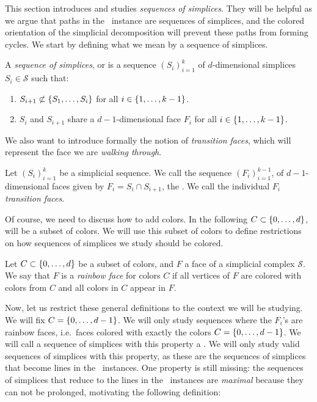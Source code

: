 This section introduces and studies \emph{sequences of simplices}.  They will be helpful as we argue that paths in the \EndOfLine\ instance are sequences of simplices, and the colored orientation of the simplicial decomposition will prevent these paths from forming cycles. We start by defining what we mean by a sequence of simplices.

\begin{definition}\label{def:sequence_of_simplices}
	A \emph{sequence of simplices}, or  is a sequence ${\left(S_i\right)}_{i=1}^{k}$ of $d$-dimensional simplices $S_i \in \mathcal{S}$ such that:
	\begin{enumerate}
		\item $S_{i+1} \not\subset \left\{S_1, \dots, S_i\right\}$ for all $i \in \left\{1, \dots, k-1\right\}$.
		\item $S_i$ and $S_{i+1}$ share a $d-1$-dimensional face $F_i$ for all $i \in \left\{1, \dots, k-1\right\}$.
	\end{enumerate}
\end{definition}

We also want to introduce formally the notion of \emph{transition faces}, which will represent the face we are \emph{walking through}.

\begin{definition}\label{def:transition_faces}
	Let ${\left(S_i\right)}_{i=1}^{k}$ be a simplicial sequence. We call the sequence ${\left(F_i\right)}_{i=1}^{k-1}$, of $d-1$-dimensional faces given by $F_i = S_i \cap S_{i+1}$, the . We call the individual $F_i$ \emph{transition faces}.
\end{definition}

Of course, we need to discuss how to add colors. In the following $C \subset \left\{0, \dots, d\right\}$, will be a subset of colors. We will use this subset of colors to define restrictions on how sequences of simplices we study should be colored.

\begin{definition}
	Let $C \subset \left\{0, \dots, d\right\}$ be a subset of colors, and $F$ a face of a simplicial complex $\mathcal{S}$. We say that $F$ is a \emph{rainbow face} for colors $C$ if all vertices of $F$ are colored with colors from $C$ and all colors in $C$ appear in $F$.
\end{definition}

Now, let us restrict these general definitions to the context we will be studying. We will fix $C = \left\{0, \dots, d-1\right\}$.  We will only study sequences where the $F_i$'s are rainbow faces, i.e.~faces colored with exactly the colors $C = \left\{0, \dots, d-1\right\}$. We will call a sequence of simplices with this property a . We will only study valid sequences of simplices with this property, as these are the sequences of simplices that become lines in the \EndOfLine\ instances. One property is still missing: the sequences of simplices that reduce to the lines in the \EndOfLine\ instances are \emph{maximal} because they can not be prolonged, motivating the following definition:

